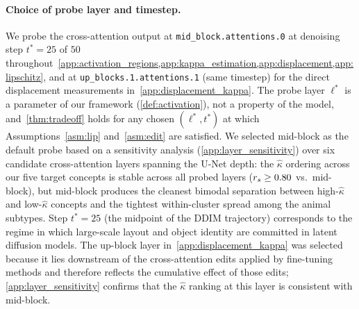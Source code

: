 \paragraph{Choice of probe layer and timestep.}
We probe the cross-attention output at \texttt{mid\_block.attentions.0} at denoising step $t^*=25$ of $50$ throughout~\cref{app:activation_regions,app:kappa_estimation,app:displacement,app:lipschitz}, and at \texttt{up\_blocks.1.attentions.1} (same timestep) for the direct displacement measurements in~\cref{app:displacement_kappa}. The probe layer $\ell^*$ is a parameter of our framework (\cref{def:activation}), not a property of the model, and~\cref{thm:tradeoff} holds for any chosen $(\ell^*, t^*)$ at which Assumptions~\ref{asm:lip} and~\ref{asm:edit} are satisfied. We selected mid-block as the default probe based on a sensitivity analysis (\cref{app:layer_sensitivity}) over six candidate cross-attention layers spanning the U-Net depth: the $\hat\kappa$ ordering across our five target concepts is stable across all probed layers ($r_s \geq 0.80$ vs.\ mid-block), but mid-block produces the cleanest bimodal separation between high-$\hat\kappa$ and low-$\hat\kappa$ concepts and the tightest within-cluster spread among the animal subtypes. Step $t^*=25$ (the midpoint of the DDIM trajectory) corresponds to the regime in which large-scale layout and object identity are committed in latent diffusion models. The up-block layer in~\cref{app:displacement_kappa} was selected because it lies downstream of the cross-attention edits applied by fine-tuning methods and therefore reflects the cumulative effect of those edits; \cref{app:layer_sensitivity} confirms that the $\hat\kappa$ ranking at this layer is consistent with mid-block.